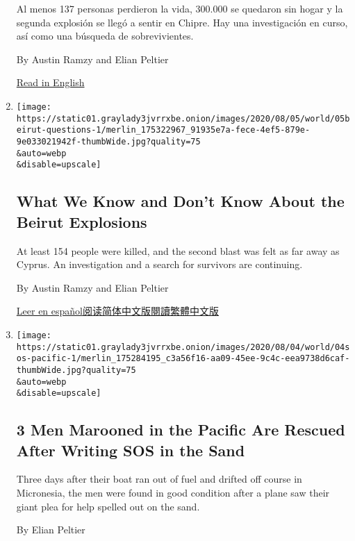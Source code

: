 \begin{enumerate}
  Al menos 137 personas perdieron la vida, 300.000 se quedaron sin hogar
  y la segunda explosión se llegó a sentir en Chipre. Hay una
  investigación en curso, así como una búsqueda de sobrevivientes.

  By Austin Ramzy and Elian Peltier

  \href{https://www.nytimes3xbfgragh.onion/2020/08/05/world/middleeast/beirut-explosion-what-happened.html}{Read
  in English}
\item
  \href{/2020/08/05/world/middleeast/beirut-explosion-what-happened.html}{}

  \texttt{[image: https://static01.graylady3jvrrxbe.onion/images/2020/08/05/world/05beirut-questions-1/merlin\_175322967\_91935e7a-fece-4ef5-879e-9e033021942f-thumbWide.jpg?quality=75\\\&auto=webp\\\&disable=upscale]}

  \hypertarget{what-we-know-and-dont-know-about-the-beirut-explosions}{%
  \subsection{What We Know and Don't Know About the Beirut
  Explosions}\label{what-we-know-and-dont-know-about-the-beirut-explosions}}

  At least 154 people were killed, and the second blast was felt as far
  away as Cyprus. An investigation and a search for survivors are
  continuing.

  By Austin Ramzy and Elian Peltier

  \href{https://www.nytimes3xbfgragh.onion/es/2020/08/05/espanol/mundo/explosion-beirut-que-paso.html}{Leer
  en
  español}\href{https://cn.nytimes3xbfgragh.onion/world/20200806/beirut-explosion-what-happened/}{阅读简体中文版}\href{https://cn.nytimes3xbfgragh.onion/world/20200806/beirut-explosion-what-happened/zh-hant/}{閱讀繁體中文版}
\item
  \href{/2020/08/04/world/australia/sos-pacific-island.html}{}

  \texttt{[image: https://static01.graylady3jvrrxbe.onion/images/2020/08/04/world/04sos-pacific-1/merlin\_175284195\_c3a56f16-aa09-45ee-9c4c-eea9738d6caf-thumbWide.jpg?quality=75\\\&auto=webp\\\&disable=upscale]}

  \hypertarget{3-men-marooned-in-the-pacific-are-rescued-after-writing-sos-in-the-sand}{%
  \subsection{3 Men Marooned in the Pacific Are Rescued After Writing
  SOS in the
  Sand}\label{3-men-marooned-in-the-pacific-are-rescued-after-writing-sos-in-the-sand}}

  Three days after their boat ran out of fuel and drifted off course in
  Micronesia, the men were found in good condition after a plane saw
  their giant plea for help spelled out on the sand.

  By Elian Peltier
\end{enumerate}


